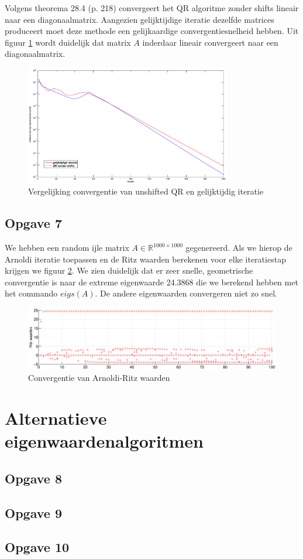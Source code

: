 \documentclass[a4paper, 12pt, titlepage]{report}
\begin{document}
Volgens theorema 28.4 (p. 218) convergeert het QR algoritme zonder shifts lineair naar een diagonaalmatrix. Aangezien gelijktijdige iteratie dezelfde matrices produceert moet deze methode een gelijkaardige convergentiesnelheid hebben. Uit figuur \ref{vglSimQR} wordt duidelijk dat matrix $A$ inderdaar lineair convergeert naar een diagonaalmatrix.


\begin{figure}[htb]
	\centering
	\includegraphics[width=0.8\textwidth]{vergelijkingLineair.eps}
	\caption{Vergelijking convergentie van unshifted QR en gelijktijdig iteratie}
	\label{vglSimQR}
\end{figure}


\subsection{Opgave 7}
We hebben een random ijle matrix $A \in \mathbb{R}^{1000\times1000}$ gegenereerd. Als we hierop de Arnoldi iteratie toepassen en de Ritz waarden berekenen voor elke iteratiestap krijgen we figuur \ref{arnoldiGraph}. We zien duidelijk dat er zeer snelle, geometrische convergentie is naar de extreme eigenwaarde 24.3868 die we berekend hebben met het commando $eigs(A)$. De andere eigenwaarden convergeren niet zo snel. 
\begin{figure}[htb]
	\begin{center}
	 \includegraphics[width=1.2\textwidth]{arnoldi.eps}
	\caption{Convergentie van Arnoldi-Ritz waarden}
	\label{arnoldiGraph}
	\end{center}

	
\end{figure}
\section{Alternatieve eigenwaardenalgoritmen}

\subsection{Opgave 8}

\subsection{Opgave 9}

\subsection{Opgave 10}
\end{document}
